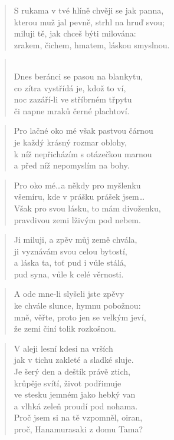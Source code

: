 \documentclass{book}
\begin{document}
\begin{verse}
S rukama v tvé hlíně chvěji se jak panna,\\
kterou muž jal pevně, strhl na hruď svou;\\
miluji tě, jak chceš býti milována:\\
zrakem, čichem, hmatem, láskou smyslnou.
\end{verse}
\begin{verse}
\large{}\\
\normalsize
Dnes beránci se pasou na blankytu,\\
co zítra vystřídá je, kdož to ví,\\
noc zazáří-li ve stříbrném třpytu\\
či napne mraků černé plachtoví.
\end{verse}
\begin{verse}
Pro lačné oko mé však pastvou čárnou\\
je každý krásný rozmar oblohy,\\
k níž nepřicházím s otázečkou marnou\\
a před níž nepomyslím na bohy.
\end{verse}
\begin{verse}
Pro oko mé\ldots a někdy pro myšlenku\\
všemíru, kde v prášku prášek jsem\ldots\\
Však pro svou lásku, to mám divoženku,\\
pravdivou zemi lživým pod nebem.
\end{verse}
\begin{verse}
Ji miluji, a zpěv můj země chvála,\\
ji vyznávám svou celou bytostí,\\
a láska ta, toť pud i vůle stálá,\\
pud syna, vůle k celé věrnosti.
\end{verse}
\begin{verse}
A ode mne-li slyšeli jste zpěvy\\
ke chvále slunce, hymnu pobožnou:\\
mně, věřte, proto jen se velkým jeví,\\
že zemi činí tolik rozkošnou.
\end{verse}
\newpage
{}
\begin{verse}
V aleji lesní kdesi na vrších\\
jak v tichu zakleté a sladké sluje.\\
Je šerý den a deštík právě ztich,\\
krůpěje svítí, život podřimuje\\
ve stesku jemném jako hebký van\\
a vlhká zeleň proudí pod nohama.\\
Proč jsem si na tě vzpomněl, oiran,\\
proč, Hanamurasaki z domu Tama?
\end{verse}
\end{document}
